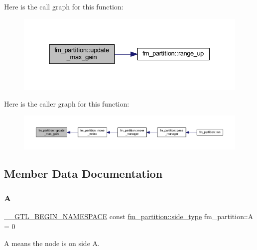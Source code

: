 Here is the call graph for this function\+:\nopagebreak
\begin{figure}[H]
\begin{center}
\leavevmode
\includegraphics[width=331pt]{classfm__partition_a335722b73c1d6f02d1083e76a3937b01_cgraph}
\end{center}
\end{figure}
Here is the caller graph for this function\+:\nopagebreak
\begin{figure}[H]
\begin{center}
\leavevmode
\includegraphics[width=350pt]{classfm__partition_a335722b73c1d6f02d1083e76a3937b01_icgraph}
\end{center}
\end{figure}


\subsection{Member Data Documentation}
\mbox{\label{classfm__partition_a738e75c601403754e61e6dac623fd3ab}} 
\subsubsection{\texorpdfstring{A}{A}}
{\footnotesize\ttfamily \mbox{\hyperlink{_g_t_l_8h_a2d9f24096ac60918452dd51f32b64aa9}{\+\_\+\+\_\+\+G\+T\+L\+\_\+\+B\+E\+G\+I\+N\+\_\+\+N\+A\+M\+E\+S\+P\+A\+CE}} const \mbox{\hyperlink{classfm__partition_a7cdff1bea3740a287387e8408e16ca79}{fm\+\_\+partition\+::side\+\_\+type}} fm\+\_\+partition\+::A = 0\hspace{0.3cm}{\ttfamily [static]}}

{\ttfamily A} means the node is on side A.

